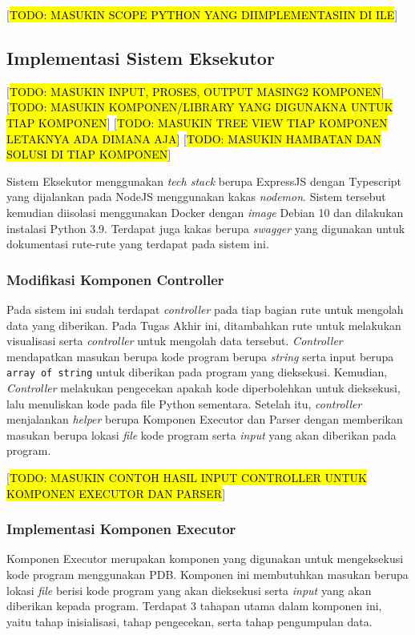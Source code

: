  [\hl{TODO: MASUKIN SCOPE PYTHON YANG DIIMPLEMENTASIIN DI ILE}]

\subsection{Implementasi Sistem Eksekutor}
[\hl{TODO: MASUKIN INPUT, PROSES, OUTPUT MASING2 KOMPONEN}]
[\hl{TODO: MASUKIN KOMPONEN/LIBRARY YANG DIGUNAKNA UNTUK TIAP KOMPONEN}]
[\hl{TODO: MASUKIN TREE VIEW TIAP KOMPONEN LETAKNYA ADA DIMANA AJA}]
[\hl{TODO: MASUKIN HAMBATAN DAN SOLUSI DI TIAP KOMPONEN}]

Sistem Eksekutor menggunakan \textit{tech stack} berupa ExpressJS dengan Typescript yang dijalankan pada NodeJS menggunakan kakas \textit{nodemon}. Sistem tersebut kemudian diisolasi menggunakan Docker dengan \textit{image} Debian 10 dan dilakukan instalasi Python 3.9. Terdapat juga kakas berupa \textit{swagger} yang digunakan untuk dokumentasi rute-rute yang terdapat pada sistem ini.

\subsubsection{Modifikasi Komponen Controller}
Pada sistem ini sudah terdapat \textit{controller} pada tiap bagian rute untuk mengolah data yang diberikan. Pada Tugas Akhir ini, ditambahkan rute untuk melakukan visualisasi serta \textit{controller} untuk mengolah data tersebut. \textit{Controller} mendapatkan masukan berupa kode program berupa \textit{string} serta input berupa \verb|array of string| untuk diberikan pada program yang dieksekusi. Kemudian, \textit{Controller} melakukan pengecekan apakah kode diperbolehkan untuk dieksekusi, lalu menuliskan kode pada file Python sementara. Setelah itu, \textit{controller} menjalankan \textit{helper} berupa Komponen Executor dan Parser dengan memberikan masukan berupa lokasi \textit{file} kode program serta \textit{input} yang akan diberikan pada program.

  [\hl{TODO: MASUKIN CONTOH HASIL INPUT CONTROLLER UNTUK KOMPONEN EXECUTOR DAN PARSER}]

\subsubsection{Implementasi Komponen Executor}
Komponen Executor merupakan komponen yang digunakan untuk mengeksekusi kode program menggunakan PDB. Komponen ini membutuhkan masukan berupa lokasi \textit{file} berisi kode program yang akan dieksekusi serta \textit{input} yang akan diberikan kepada program. Terdapat 3 tahapan utama dalam komponen ini, yaitu tahap inisialisasi, tahap pengecekan, serta tahap pengumpulan data.

